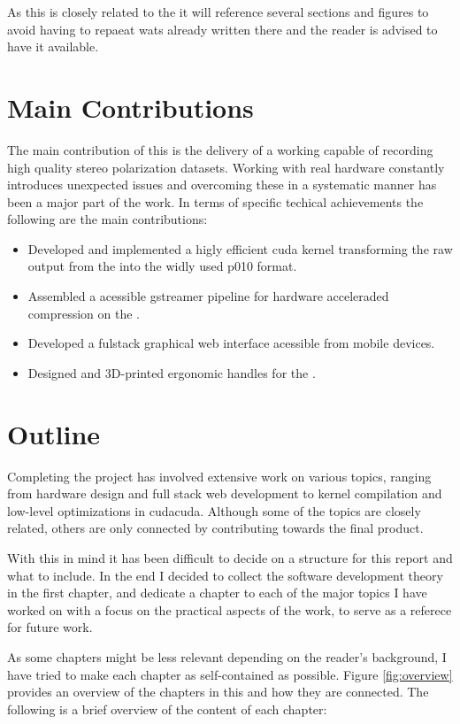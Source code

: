 As this \master is closely related to the \preproject it will reference several sections and figures to avoid having to repaeat wats already written there and the reader is advised to have it available.

\section{Main Contributions}
The main contribution of this \master is the delivery of a working \sr capable of recording high quality stereo polarization datasets.
Working with real hardware constantly introduces unexpected issues and overcoming these in a systematic manner has been a major part of the work.
In terms of specific techical achievements the following are the main contributions:

\begin{itemize}
    \item Developed and implemented a higly efficient \gls{cuda} kernel transforming the raw output from the \cams into the widly used \gls{p010} format.
    \item Assembled a \py acessible \gls{gstreamer} pipeline for hardware acceleraded compression on the \jx.
    \item Developed a fulstack graphical web interface acessible from mobile devices.
    \item Designed and 3D-printed ergonomic handles for the \sr.
\end{itemize}


\section{Outline}
Completing the \sr project has involved extensive work on various topics, ranging from hardware design and full stack web development to kernel compilation and low-level optimizations in \gls{cuda}{cuda}.
Although some of the topics are closely related, others are only connected  by contributing towards the final product.

With this in mind it has been difficult to decide on a structure for this report and what to include.
In the end I decided to collect the software development theory in the first chapter, and dedicate a chapter to each of the major topics I have worked on with a focus on the practical aspects of the work, to serve as a referece for future work.

As some chapters might be less relevant depending on the reader's background, I have tried to make each chapter as self-contained as possible.
Figure \ref{fig:overview} provides an overview of the chapters in this \master and how they are connected.
The following is a brief overview of the content of each chapter:

